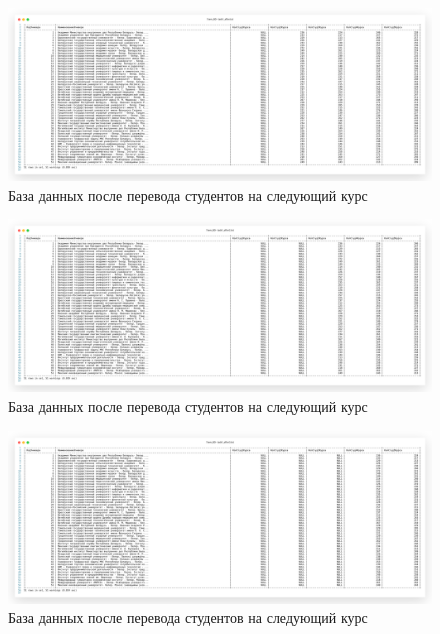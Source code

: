 \begin{figure}[!h]
  \centering

  \includegraphics[width=18cm]
  {../sql/task1/task1_after.png}

  \caption{База данных после перевода студентов на следующий курс}

  \label{fig:task1_2}
\end{figure}

\begin{figure}[!h]
  \centering

  \includegraphics[width=18cm]
  {../sql/task1/task1_after2.png}

  \caption{База данных после перевода студентов на следующий курс}

  \label{fig:task1_3}
\end{figure}

\begin{figure}[!h]
  \centering

  \includegraphics[width=18cm]
  {../sql/task1/task1_after3.png}

  \caption{База данных после перевода студентов на следующий курс}

  \label{fig:task1_4}
\end{figure}

